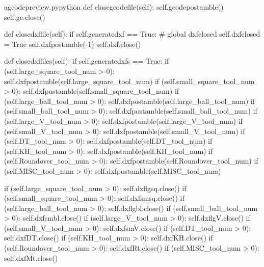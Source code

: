 \documentclass{ltxdoc}
\begin{document}
\lstset{firstnumber=\thegcpy}
\begin{writecode}{a}{gcodepreview.py}{python}
    def closegcodefile(self):
        self.gcodepostamble()
        self.gc.close()

    def closedxffile(self):
        if self.generatedxf == True:
#            global dxfclosed
            self.dxfclosed = True
            self.dxfpostamble(-1)
            self.dxf.close()
    
    def closedxffiles(self):
        if self.generatedxfs == True:
            if (self.large_square_tool_num > 0):
                self.dxfpostamble(self.large_square_tool_num)
            if (self.small_square_tool_num > 0):
                self.dxfpostamble(self.small_square_tool_num)
            if (self.large_ball_tool_num > 0):
                self.dxfpostamble(self.large_ball_tool_num)
            if (self.small_ball_tool_num > 0):
                self.dxfpostamble(self.small_ball_tool_num)
            if (self.large_V_tool_num > 0):
                self.dxfpostamble(self.large_V_tool_num)
            if (self.small_V_tool_num > 0):
                self.dxfpostamble(self.small_V_tool_num)
            if (self.DT_tool_num > 0):
                self.dxfpostamble(self.DT_tool_num)
            if (self.KH_tool_num > 0):
                self.dxfpostamble(self.KH_tool_num)
            if (self.Roundover_tool_num > 0):
                self.dxfpostamble(self.Roundover_tool_num)
            if (self.MISC_tool_num > 0):
                self.dxfpostamble(self.MISC_tool_num)
                
            if (self.large_square_tool_num > 0):
                self.dxflgsq.close()
            if (self.small_square_tool_num > 0):
                self.dxfsmsq.close()
            if (self.large_ball_tool_num > 0):
                self.dxflgbl.close()
            if (self.small_ball_tool_num > 0):
                self.dxfsmbl.close()
            if (self.large_V_tool_num > 0):
                self.dxflgV.close()
            if (self.small_V_tool_num > 0):
                self.dxfsmV.close()
            if (self.DT_tool_num > 0):
                self.dxfDT.close()
            if (self.KH_tool_num > 0):
                self.dxfKH.close()
            if (self.Roundover_tool_num > 0):
                self.dxfRt.close()
            if (self.MISC_tool_num > 0):
                self.dxfMt.close()

\end{writecode}
\addtocounter{gcpy}{55}
%
\end{document}
